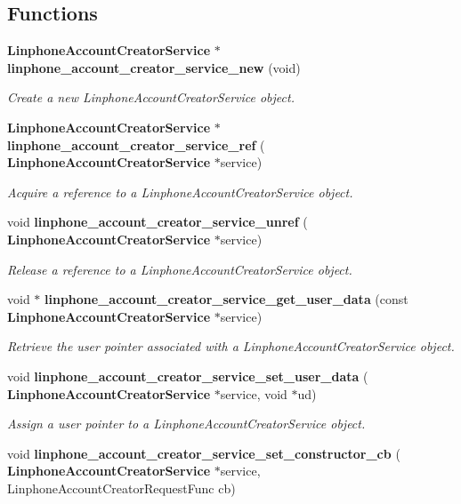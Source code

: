 \subsection*{Functions}
\begin{DoxyCompactItemize}
\item 
\textbf{ Linphone\+Account\+Creator\+Service} $\ast$ \textbf{ linphone\+\_\+account\+\_\+creator\+\_\+service\+\_\+new} (void)
\begin{DoxyCompactList}\small\item\em Create a new Linphone\+Account\+Creator\+Service object. \end{DoxyCompactList}\item 
\textbf{ Linphone\+Account\+Creator\+Service} $\ast$ \textbf{ linphone\+\_\+account\+\_\+creator\+\_\+service\+\_\+ref} (\textbf{ Linphone\+Account\+Creator\+Service} $\ast$service)
\begin{DoxyCompactList}\small\item\em Acquire a reference to a Linphone\+Account\+Creator\+Service object. \end{DoxyCompactList}\item 
void \textbf{ linphone\+\_\+account\+\_\+creator\+\_\+service\+\_\+unref} (\textbf{ Linphone\+Account\+Creator\+Service} $\ast$service)
\begin{DoxyCompactList}\small\item\em Release a reference to a Linphone\+Account\+Creator\+Service object. \end{DoxyCompactList}\item 
void $\ast$ \textbf{ linphone\+\_\+account\+\_\+creator\+\_\+service\+\_\+get\+\_\+user\+\_\+data} (const \textbf{ Linphone\+Account\+Creator\+Service} $\ast$service)
\begin{DoxyCompactList}\small\item\em Retrieve the user pointer associated with a Linphone\+Account\+Creator\+Service object. \end{DoxyCompactList}\item 
void \textbf{ linphone\+\_\+account\+\_\+creator\+\_\+service\+\_\+set\+\_\+user\+\_\+data} (\textbf{ Linphone\+Account\+Creator\+Service} $\ast$service, void $\ast$ud)
\begin{DoxyCompactList}\small\item\em Assign a user pointer to a Linphone\+Account\+Creator\+Service object. \end{DoxyCompactList}\item 
void \textbf{ linphone\+\_\+account\+\_\+creator\+\_\+service\+\_\+set\+\_\+constructor\+\_\+cb} (\textbf{ Linphone\+Account\+Creator\+Service} $\ast$service, Linphone\+Account\+Creator\+Request\+Func cb)

\end{DoxyCompactItemize}
